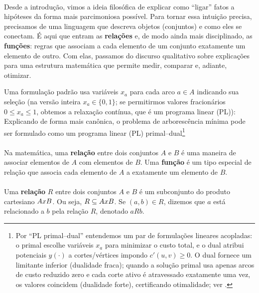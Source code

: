 \documentclass[12pt,a4paper]{article}
\def\times{\string x}%
\begin{document}
\paragraph{}
Desde a introdução, vimos a ideia filosófica de explicar como “ligar” fatos a hipóteses da forma mais parcimoniosa possível. Para tornar essa intuição precisa, precisamos de uma linguagem que descreva objetos (conjuntos) e como eles se conectam. É aqui que entram as \textbf{relações} e, de modo ainda mais disciplinado, as \textbf{funções}: regras que associam a cada elemento de um conjunto exatamente um elemento de outro. Com elas, passamos do discurso qualitativo sobre explicações para uma estrutura matemática que permite medir, comparar e, adiante, otimizar.

Uma formulação padrão usa variáveis \(x_a\) para cada arco \(a\in A\) indicando sua seleção (na versão inteira \(x_a\in\{0,1\}\); se permitirmos valores fracionários \(0\le x_a\le 1\), obtemos a relaxação contínua, que é um programa linear (PL)):
Explicando de forma mais canônica, o problema de arborescência mínima pode ser formulado como um programa linear (PL) primal–dual\footnote{Por “PL primal–dual” entendemos um par de formulações lineares acopladas: o primal escolhe variáveis $x_a$ para minimizar o custo total, e o dual atribui potenciais $y(\cdot)$ a cortes/vértices impondo $c'(u,v)\ge 0$. O dual fornece um limitante inferior (dualidade fraca); quando a solução primal usa apenas arcos de custo reduzido zero e cada corte ativo é atravessado exatamente uma vez, os valores coincidem (dualidade forte), certificando otimalidade; ver \cite{schrijver2003comb,frank2014}.}
\paragraph{}
Na matemática, uma \textbf{relação} entre dois conjuntos \(A\) e \(B\) é uma maneira de associar elementos de \(A\) com elementos de \(B\). Uma \textbf{função} é um tipo especial de relação que associa cada elemento de \(A\) a exatamente um elemento de \(B\).

\paragraph{}
Uma \textbf{relação} \(R\) entre dois conjuntos \(A\) e \(B\) é um subconjunto do produto cartesiano \(A \times B\). Ou seja, \(R \subseteq A \times B\). Se \((a,b) \in R\), dizemos que \(a\) está relacionado a \(b\) pela relação \(R\), denotado \(aRb\).
\end{document}

